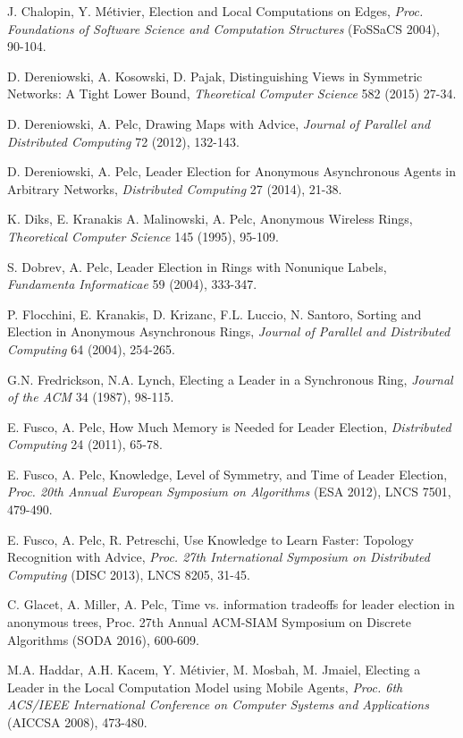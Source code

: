 \documentclass[a4paper,10pt]{article}
\begin{document}
\begin{thebibliography}{99}
J. Chalopin, Y. M\'etivier,
Election and Local Computations on Edges,
{\em Proc. Foundations of Software Science and Computation Structures} (FoSSaCS 2004), 90-104.

D. Dereniowski, A. Kosowski, D. Pajak, Distinguishing Views in Symmetric Networks: A Tight Lower Bound,
{\em Theoretical Computer Science} 582 (2015) 27-34.

D. Dereniowski, A. Pelc, Drawing Maps with Advice,  {\em Journal of Parallel and Distributed Computing} 72 (2012), 132-143. 

D. Dereniowski, A. Pelc, Leader Election for Anonymous Asynchronous Agents in Arbitrary Networks, {\em Distributed Computing} 27 (2014), 21-38. 

K. Diks, E. Kranakis A. Malinowski, A. Pelc,
Anonymous Wireless Rings,
{\em Theoretical Computer Science} 145 (1995), 95-109.

S. Dobrev, A. Pelc, 
Leader Election in Rings with Nonunique Labels, {\em Fundamenta Informaticae} 59 (2004), 333-347. 

P. Flocchini, E. Kranakis, D. Krizanc, F.L. Luccio, N. Santoro,
Sorting and Election in Anonymous Asynchronous Rings,
{\em Journal of Parallel and Distributed Computing} 64 (2004), 254-265.

G.N. Fredrickson, N.A. Lynch,
Electing a Leader in a Synchronous Ring,
{\em Journal of the ACM} 34 (1987), 98-115.

E. Fusco, A. Pelc, How Much Memory is Needed for Leader Election, {\em Distributed Computing} 24 (2011), 65-78. 

E. Fusco, A. Pelc, Knowledge, Level of Symmetry, and Time of Leader Election,
{\em Proc. 20th Annual European Symposium on Algorithms} (ESA 2012), LNCS 7501, 479-490. 

E. Fusco, A. Pelc, R. Petreschi, Use Knowledge to Learn Faster: Topology Recognition with Advice,
{\em Proc. 27th International Symposium on Distributed Computing} (DISC 2013), LNCS 8205, 31-45. 

C. Glacet, A. Miller, A. Pelc, Time vs. information tradeoffs for leader election in anonymous trees, Proc. 27th Annual ACM-SIAM Symposium on Discrete Algorithms (SODA 2016), 600-609.




M.A. Haddar, A.H. Kacem, Y. M\'{e}tivier, M. Mosbah, M. Jmaiel, Electing a Leader in the Local Computation Model using Mobile Agents,
{\em Proc.  6th ACS/IEEE International Conference on Computer Systems and Applications} (AICCSA 2008), 473-480.


\end{thebibliography}
\end{document}
